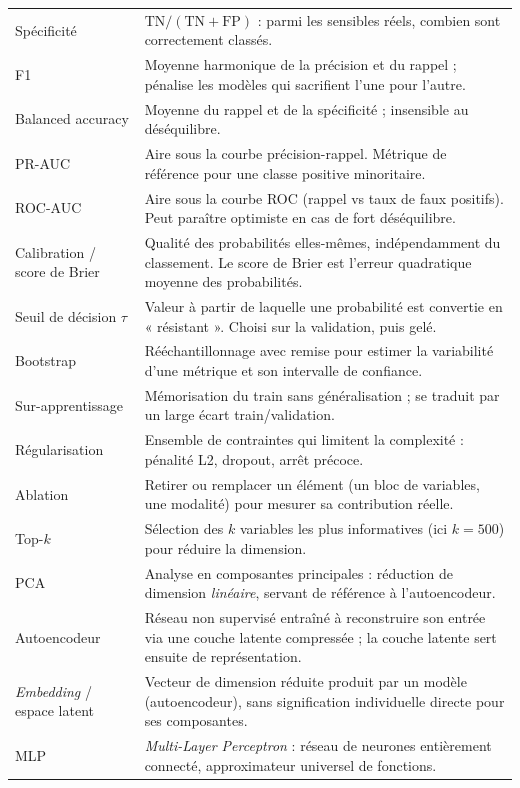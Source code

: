 \documentclass[11pt,a4paper]{article}
\begin{document}
\begin{longtable}{@{}>{\raggedright\arraybackslash}p{3.5cm}>{\raggedright\arraybackslash}p{12cm}@{}}
Spécificité & $\mathrm{TN}/(\mathrm{TN}+\mathrm{FP})$ : parmi les sensibles réels, combien sont correctement classés. \\
F1 & Moyenne harmonique de la précision et du rappel ; pénalise les modèles qui sacrifient l'une pour l'autre. \\
Balanced accuracy & Moyenne du rappel et de la spécificité ; insensible au déséquilibre. \\
PR-AUC & Aire sous la courbe précision-rappel. Métrique de référence pour une classe positive minoritaire. \\
ROC-AUC & Aire sous la courbe ROC (rappel vs taux de faux positifs). Peut paraître optimiste en cas de fort déséquilibre. \\
Calibration / score de Brier & Qualité des probabilités elles-mêmes, indépendamment du classement. Le score de Brier est l'erreur quadratique moyenne des probabilités. \\
Seuil de décision $\tau$ & Valeur à partir de laquelle une probabilité est convertie en « résistant ». Choisi sur la validation, puis gelé. \\
Bootstrap & Rééchantillonnage avec remise pour estimer la variabilité d'une métrique et son intervalle de confiance. \\
Sur-apprentissage & Mémorisation du train sans généralisation ; se traduit par un large écart train/validation. \\
Régularisation & Ensemble de contraintes qui limitent la complexité : pénalité L2, dropout, arrêt précoce. \\
Ablation & Retirer ou remplacer un élément (un bloc de variables, une modalité) pour mesurer sa contribution réelle. \\
Top-$k$ & Sélection des $k$ variables les plus informatives (ici $k=500$) pour réduire la dimension. \\
PCA & Analyse en composantes principales : réduction de dimension \emph{linéaire}, servant de référence à l'autoencodeur. \\
Autoencodeur & Réseau non supervisé entraîné à reconstruire son entrée via une couche latente compressée ; la couche latente sert ensuite de représentation. \\
\emph{Embedding} / espace latent & Vecteur de dimension réduite produit par un modèle (autoencodeur), sans signification individuelle directe pour ses composantes. \\
MLP & \emph{Multi-Layer Perceptron} : réseau de neurones entièrement connecté, approximateur universel de fonctions. \\

\end{longtable}
\end{document}
